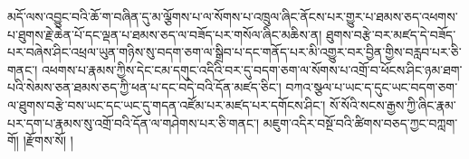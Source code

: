 མདོ་ལས་འབྱུང་བའི་ཆོ་ག་བཞིན་དུ་མ་ལྕོགས་པ་ལ་སོགས་པ་འཁྲུལ་ཞིང་ནོངས་པར་གྱུར་པ་ཐམས་ཅད་འཕགས་པ་ཐུགས་རྗེ་ཆེན་པོ་དང་ལྡན་པ་ཐམས་ཅད་ལ་བཟོད་པར་གསོལ་ཞིང་མཆིས་ན། ཐུགས་བརྩེ་བར་མཛད་དེ་བཟོད་པར་བཞེས་ཤིང་འཕྲལ་ཡུན་གཉིས་སུ་བདག་ཅག་ལ་སྒྲིབ་པ་དང་གནོད་པར་མི་འགྱུར་བར་བྱིན་གྱིས་བརླབ་པར་ཅི་གནང་། འཕགས་པ་རྣམས་ཀྱིས་དེང་ངམ་དགུང་འདིའི་བར་དུ་བདག་ཅག་ལ་སོགས་པ་འགྲོ་བ་ཕོངས་ཤིང་ཉམ་ཐག་པའི་སེམས་ཅན་ཐམས་ཅད་ཀྱི་ཕན་པ་དང་བདེ་བའི་དོན་མཛད་ཅིང་། བཀའ་སྩལ་པ་ཡང་ད་དུང་ཡང་བདག་ཅག་ལ་ཐུགས་བརྩེ་བས་ཡང་དང་ཡང་དུ་གདན་འཛོམ་པར་མཛད་པར་དགོངས་ཤིང་། སོ་སོའི་སངས་རྒྱས་ཀྱི་ཞིང་རྣམ་པར་དག་པ་རྣམས་སུ་འགྲོ་བའི་དོན་ལ་གཤེགས་པར་ཅི་གནང་། མཇུག་འདིར་བསྔོ་བའི་ཚིགས་བཅད་ཀྱང་བཀླག་གོ། །རྫོགས་སོ། ། 
